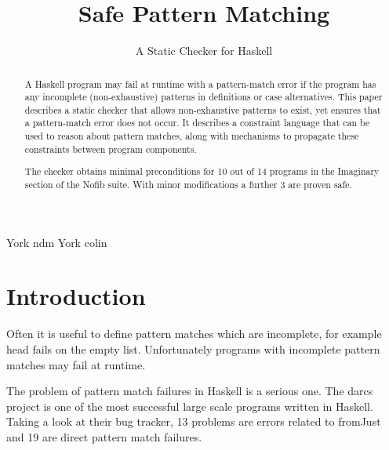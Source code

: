 \documentclass[preprint]{sigplanconf}
\newcommand{\C}[1]{\textsf{#1}}
\begin{document}
\copyrightdata{[to be supplied]}

\titlebanner{\today{} - \currenttime{}}        %
\preprintfooter{}   %

\title{Safe Pattern Matching}
\subtitle{A Static Checker for Haskell}

           {York}
           {ndm}
           {York}
           {colin}

\maketitle

\begin{abstract}
A Haskell program may fail at runtime with a pattern-match error if the program has any incomplete (non-exhaustive) patterns in definitions or case alternatives. This paper describes a static checker that allows non-exhaustive patterns to exist, yet ensures that a pattern-match error does not occur. It describes a constraint language that can be used to reason about pattern matches, along with mechanisms to propagate these constraints between program components.

The checker obtains minimal preconditions for 10 out of 14 programs in the Imaginary section of the Nofib suite\citep{nofib}. With minor modifications a further 3 are proven safe.
\end{abstract}




\section{Introduction}
\label{sec:introduction}

Often it is useful to define pattern matches which are incomplete, for example \C{head} fails on the empty list. Unfortunately programs with incomplete pattern matches may fail at runtime.

The problem of pattern match failures in Haskell is a serious one. The darcs \citep{darcs} project is one of the most successful large scale programs written in Haskell. Taking a look at their bug tracker, 13 problems are errors related to \C{fromJust} and 19 are direct pattern match failures.
\end{document}
